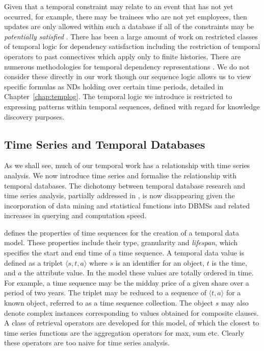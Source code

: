 Given that a temporal constraint may relate to an event that has not
yet occurred, for example, there may be trainees who are not yet
employees, then updates are only allowed within such a database if all
of the constraints may be {\em potentially satisfied}
\cite{ct98}. There has been a large amount of work on restricted
classes of temporal logic for dependency satisfaction including the
restriction of temporal operators to past connectives which apply only
to finite histories.
There are numerous methodologies for
temporal dependency representations \cite{jss96}. We do not consider these
directly in our work though our sequence logic allows us to view
specific formulas as NDs holding over certain time periods, detailed
in Chapter~\ref{chap:templog}. The temporal logic we introduce is
restricted to expressing patterns within temporal sequences, defined
with regard for knowledge discovery purposes. 


\subsection{Time Series and Temporal Databases}
As we shall see, much of our temporal work has a relationship with
time series analysis. We now introduce time series and formalise the
relationship with temporal databases. The dichotomy between temporal
database research and time series analysis, partially addressed in
\cite{smd95}, is now disappearing given the incorporation of data
mining and statistical functions into DBMSs and related increases in
querying and computation speed.

\medskip
\cite{ss93} defines the properties of time sequences for the creation
of a temporal data model. These properties include their type,
granularity and {\em lifespan}, which specifies the start and end time of a
time sequence. A temporal data value is defined as a
triplet $\langle s, t, a \rangle$ where $s$ is an identifier for an
object, $t$ is the time, and $a$ the attribute value. In the model
these values are totally ordered in time. For example, a time sequence
may be the midday price of a given share over a period of two
years. The triplet may be reduced to a sequence of $\langle t, a
\rangle$ for a known object, referred to as a time sequence
collection. The object $s$ may also denote complex instances
corresponding to values obtained for composite clauses. A class of
retrieval operators are developed for this model, of which the closest
to time series functions are the aggregation operators for max, sum
etc. Clearly these operators are too naive for time series analysis.

